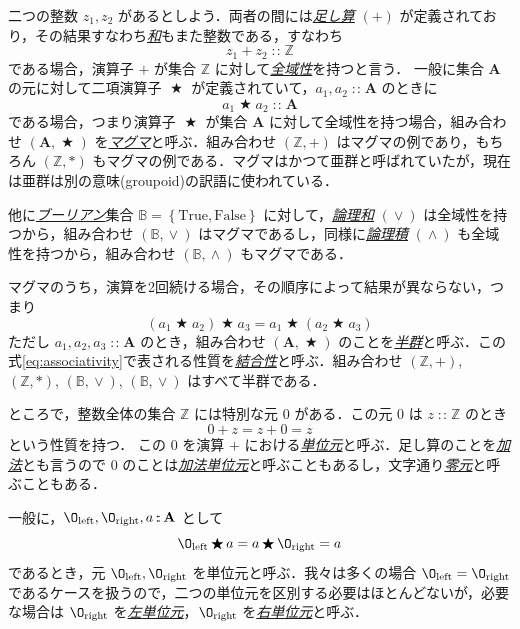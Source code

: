 \documentclass[a4paper]{jsbook}
\newcommand{\keyword}[1]{{\underline{\emph{#1}}}}
\newcommand{\mSpecialConst}[1]{\mathrm{#1}} %
\newcommand{\mTrue}{\mSpecialConst{True}}
\newcommand{\mFalse}{\mSpecialConst{False}}
\newcommand{\mZero}{\O}
\newcommand{\mSpecialSub}[1]{\text{#1}}
\newcommand{\mLeft}{\mSpecialSub{left}}
\newcommand{\mRight}{\mSpecialSub{right}}
\newcommand{\mSet}[1]{\mathbf{#1}}
\newcommand{\mSpecialSet}[1]{\mathbb{#1}} %
\newcommand{\mZSet}{\mSpecialSet{Z}}
\newcommand{\mBSet}{\mSpecialSet{B}}
\newcommand{\mSetWith}[1]{\left\{#1\right\}}
\newcommand{\mTupleWith}[1]{\left(#1\right)}
\DeclareMathOperator{\mIn}{{:\!:}}
\DeclareMathOperator{\mBinOp}{\bigstar}
\DeclareMathOperator{\mLogicalAnd}{\wedge}
\DeclareMathOperator{\mLogicalOr}{\vee}
\newcommand{\mathSet}[1]{\mathbf{#1}} %
\begin{document}
二つの整数 $z_1,z_2$ があるとしよう．両者の間には\keyword{足し算} $(+)$ が定義されており，その結果すなわち\keyword{和}もまた整数である，すなわち
\begin{equation}
z_1+z_2\mIn\mZSet
\end{equation}
である場合，演算子 $+$ が集合 $\mZSet$ に対して\keyword{全域性}を持つと言う．
一般に集合 $\mSet{A}$ の元に対して二項演算子 $\mBinOp$ が定義されていて，$a_1,a_2\mIn\mSet{A}$ のときに
\begin{equation}
\label{eq:totality}
a_1\mBinOp a_2\mIn\mSet{A}
\end{equation}
である場合，つまり演算子 $\mBinOp$ が集合 $\mSet{A}$ に対して全域性を持つ場合，組み合わせ $\mTupleWith{\mSet{A},\mBinOp}$ を\keyword{マグマ}と呼ぶ．組み合わせ $\mTupleWith{\mZSet,+}$ はマグマの例であり，もちろん $\mTupleWith{\mZSet,*}$ もマグマの例である．マグマはかつて亜群と呼ばれていたが，現在は亜群は別の意味(groupoid)の訳語に使われている．

他に\keyword{ブーリアン}集合 $\mBSet=\mSetWith{\mTrue,\mFalse}$ に対して，\keyword{論理和} $(\mLogicalOr)$ は全域性を持つから，組み合わせ $\mTupleWith{\mBSet,\mLogicalOr}$ はマグマであるし，同様に\keyword{論理積} $(\mLogicalAnd)$ も全域性を持つから，組み合わせ $\mTupleWith{\mBSet,\mLogicalAnd}$ もマグマである．

マグマのうち，演算を2回続ける場合，その順序によって結果が異ならない，つまり
\begin{equation}
\label{eq:associativity}
\left(a_1\mBinOp a_2\right)\mBinOp a_3
=a_1\mBinOp\left(a_2\mBinOp{a_3}\right)
\end{equation}
ただし $a_1,a_2,a_3\mIn\mSet{A}$ のとき，組み合わせ $\mTupleWith{\mathSet{A},\mBinOp}$ のことを\keyword{半群}と呼ぶ．この式\eqref{eq:associativity}で表される性質を\keyword{結合性}と呼ぶ．組み合わせ $\mTupleWith{\mZSet,+}$, $\mTupleWith{\mZSet,*}$, $\mTupleWith{\mBSet,\mLogicalOr}$, $\mTupleWith{\mBSet,\mLogicalOr}$ はすべて半群である．

ところで，整数全体の集合 $\mZSet$ には特別な元 $0$ がある．この元 $0$ は $z\mIn\mZSet$ のとき
\begin{equation}
0+z=z+0=z
\end{equation}
という性質を持つ．
この $0$ を演算 $+$ における\keyword{単位元}と呼ぶ．足し算のことを\keyword{加法}とも言うので $0$ のことは\keyword{加法単位元}と呼ぶこともあるし，文字通り\keyword{零元}と呼ぶこともある．

一般に，$\mZero_\mLeft,\mZero_\mRight,a\mIn\mSet{A}$ として
\begin{equation}
\label{eq:identity}
\mZero_\mLeft\mBinOp a=a\mBinOp\mZero_\mRight=a
\end{equation}
であるとき，元 $\mZero_\mLeft,\mZero_\mRight$ を単位元と呼ぶ．我々は多くの場合 $\mZero_\mLeft=\mZero_\mRight$ であるケースを扱うので，二つの単位元を区別する必要はほとんどないが，必要な場合は $\mZero_\mRight$ を\keyword{左単位元}，$\mZero_\mRight$ を\keyword{右単位元}と呼ぶ．
\end{document}
